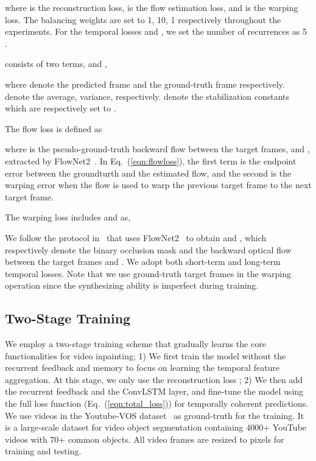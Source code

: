 \documentclass[10pt,twocolumn,letterpaper]{article}
\newcommand{\eqnref}[1]{Eq.~(\ref{#1})}
\begin{document}
where  is the reconstruction loss,  is the flow estimation loss, and  is the warping loss. The balancing weights  are set to 1, 10, 1 respectively throughout the experiments. For the temporal losses    and , we set the number of recurrences as 5 .


 consists of two terms,  and ,

where  denote the predicted frame and the ground-truth frame respectively.  denote the average, variance, respectively.  denote the stabilization constants which are respectively set to .

The flow loss  is defined as

where  is the pseudo-ground-truth backward flow between the target frames,  and , extracted by FlowNet2~\cite{ilg2017flownet}. In \eqnref{eqn:flowloss}, the first term is the endpoint error between the groundturth and the estimated flow, and the second is the warping error when the flow is used to warp the previous target frame to the next target frame.

The warping loss  includes  and  as,

We follow the protocol in~\cite{lai2018learning} that uses FlowNet2~\cite{ilg2017flownet} to obtain  and , which respectively denote the binary occlusion mask and the backward optical flow between the target frames  and . We adopt both short-term and long-term temporal losses. Note that we use ground-truth target frames in the warping operation since the synthesizing ability is imperfect during training.



\subsection{Two-Stage Training}

We employ a two-stage training scheme that gradually learns the core functionalities for video inpainting; 1) We first train the model without the recurrent feedback and memory to focus on learning the temporal feature aggregation. At this stage, we only use the reconstruction loss ; 2) We then add the recurrent feedback and the ConvLSTM layer, and fine-tune the model using the full loss function (\eqnref{eqn:total_loss}) for temporally coherent predictions. We use videos in the Youtube-VOS dataset~\cite{xu2018youtube} as ground-truth for the training. It is a large-scale dataset for video object segmentation containing 4000+ YouTube videos with 70+ common objects. All video frames are resized to  pixels for training and testing. 
\end{document}
